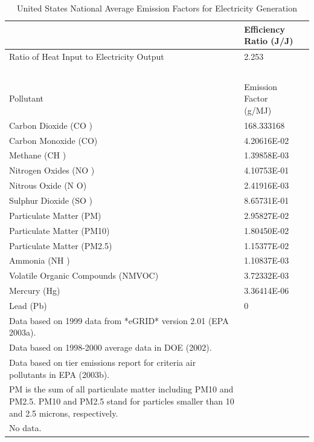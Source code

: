 \begin{longtable}[c]{p{4.5in}p{1.5in}}
\caption{  United States National Average Emission Factors for Electricity Generation \protect \label{table:united-states-national-average-emission}}\\
\toprule 
~ & Efficiency Ratio (J/J) \tabularnewline \midrule
\endhead
Ratio of Heat Input to Electricity Output & 2.253 \tabularnewline
~ & ~ \tabularnewline \midrule
Pollutant & Emission Factor~~ (g/MJ) \tabularnewline \midrule
Carbon Dioxide (CO  ) & 168.333168 \tabularnewline
Carbon Monoxide (CO) & 4.20616E-02 \tabularnewline
Methane (CH  ) & 1.39858E-03 \tabularnewline
Nitrogen Oxides (NO  ) & 4.10753E-01 \tabularnewline
Nitrous Oxide (N  O) & 2.41916E-03 \tabularnewline
Sulphur Dioxide (SO  ) & 8.65731E-01 \tabularnewline
Particulate Matter (PM) & 2.95827E-02 \tabularnewline
Particulate Matter (PM10) & 1.80450E-02 \tabularnewline
Particulate Matter (PM2.5) & 1.15377E-02 \tabularnewline
Ammonia (NH  ) & 1.10837E-03 \tabularnewline
Volatile Organic Compounds (NMVOC) & 3.72332E-03 \tabularnewline
Mercury (Hg) & 3.36414E-06 \tabularnewline
Lead (Pb) & 0 \tabularnewline
Data based on 1999 data from *eGRID* version 2.01 (EPA 2003a). \tabularnewline
Data based on 1998-2000 average data in DOE (2002). \tabularnewline
Data based on tier emissions report for criteria air pollutants in EPA (2003b). \tabularnewline
PM is the sum of all particulate matter including PM10 and PM2.5. PM10 and PM2.5 stand for particles smaller than 10 and 2.5 microns, respectively. \tabularnewline
No data. \tabularnewline
\bottomrule
\end{longtable}


